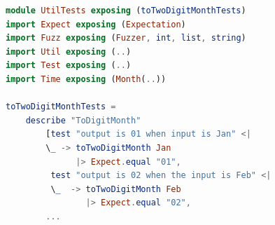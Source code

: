 \documentclass[12pt,oneside]{memoir}
\begin{document}
\begin{minipage}{\linewidth}
\begin{lstlisting}[language=elm, basicstyle=\small, caption={Implementacija testova za funkciju \emph{toTwoDigitMonth}},captionpos=b, label={lst:example}]
module UtilTests exposing (toTwoDigitMonthTests)
import Expect exposing (Expectation)
import Fuzz exposing (Fuzzer, int, list, string)
import Util exposing (..)
import Test exposing (..)
import Time exposing (Month(..))

toTwoDigitMonthTests = 
    describe "ToDigitMonth" 
        [test "output is 01 when input is Jan" <|
        \_ -> toTwoDigitMonth Jan
              |> Expect.equal "01", 
         test "output is 02 when the input is Feb" <|
         \_  -> toTwoDigitMonth Feb
                |> Expect.equal "02",
        ... 
\end{lstlisting}
\end{minipage}
\end{document}
